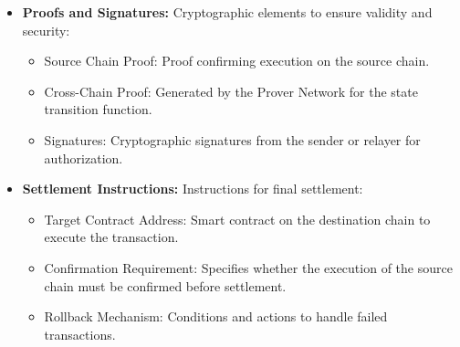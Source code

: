 \begin{itemize}
    \item \textbf{Proofs and Signatures:}
    Cryptographic elements to ensure validity and security:
    \begin{itemize}
        \item \textsf{Source Chain Proof}: Proof confirming execution on the source chain.
        \item \textsf{Cross-Chain Proof}: Generated by the Prover Network for the state transition function.
        \item \textsf{Signatures}: Cryptographic signatures from the sender or relayer for authorization.
    \end{itemize}

    \item \textbf{Settlement Instructions:}
    Instructions for final settlement:
    \begin{itemize}
        \item \textsf{Target Contract Address}: Smart contract on the destination chain to execute the transaction.
        \item \textsf{Confirmation Requirement}: Specifies whether the execution of the source chain must be confirmed before settlement.
        \item \textsf{Rollback Mechanism}: Conditions and actions to handle failed transactions.
    \end{itemize}
\end{itemize}

 

    

